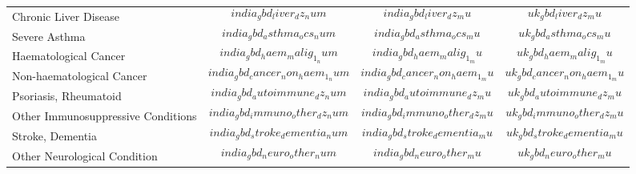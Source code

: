\begin{tabular}{p{6cm}p{1.5cm}p{1cm}p{1cm}}
Chronic Liver Disease & $$india_gbd_liver_dz_num$$ & $$india_gbd_liver_dz_mu$$ & $$uk_gbd_liver_dz_mu$$\\[0.25ex]
Severe Asthma & $$india_gbd_asthma_ocs_num$$ & $$india_gbd_asthma_ocs_mu$$ & $$uk_gbd_asthma_ocs_mu$$\\[0.25ex]
Haematological Cancer & $$india_gbd_haem_malig_1_num$$ & $$india_gbd_haem_malig_1_mu$$  & $$uk_gbd_haem_malig_1_mu$$\\[0.25ex]
Non-haematological Cancer & $$india_gbd_cancer_non_haem_1_num$$ & $$india_gbd_cancer_non_haem_1_mu$$ & $$uk_gbd_cancer_non_haem_1_mu$$\\[0.25ex]
Psoriasis, Rheumatoid & $$india_gbd_autoimmune_dz_num$$ & $$india_gbd_autoimmune_dz_mu$$ & $$uk_gbd_autoimmune_dz_mu$$\\[0.25ex]
Other Immunosuppressive Conditions & $$india_gbd_immuno_other_dz_num$$ & $$india_gbd_immuno_other_dz_mu$$ & $$uk_gbd_immuno_other_dz_mu$$\\[0.25ex]
Stroke, Dementia & $$india_gbd_stroke_dementia_num$$ & $$india_gbd_stroke_dementia_mu$$ & $$uk_gbd_stroke_dementia_mu$$\\[0.25ex]
Other Neurological Condition & $$india_gbd_neuro_other_num$$ & $$india_gbd_neuro_other_mu$$  & $$uk_gbd_neuro_other_mu$$\\[0.25ex]
\end{tabular}
